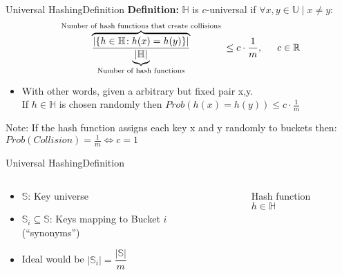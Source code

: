 
\begin{frame}{Universal Hashing}{Definition}
  \textbf{Definition:}
  $\mathbb{H}$ is {\color{Mittel-Blau}$c$-universal} if
  $\forall x, y \in \mathbb{U} \mid x \neq y:$
  \begin{displaymath}
    \overbrace{
      \frac{
        \vert \{h \in \mathbb{H}\!: h(x) = h(y)\} \vert
      }{
      \underbrace{\vert \mathbb{H} \vert}_\text{Number of hash functions}
      }
    }^\text{
      Number of hash functions that create collisions
    }
    \leq c \cdot \frac{1}{m}, \hspace*{1.5em} c \in \mathbb{R}
  \end{displaymath}
  \vspace{-1em}
  \begin{itemize}
  \item <2->
      With other words, given a arbitrary but fixed pair x,y.\\
      If $h \in \mathbb{H}$ is chosen randomly then
      $Prob ( h(x) = h(y) ) \leq c \cdot \frac{1}{m}$
  \end{itemize}
  \begin{block}{Note: If the hash function assigns each key x and y
    randomly to buckets then:}
    $Prob( Collision ) = \frac{1}{m} \Leftrightarrow c = 1$
  \end{block}
\end{frame}


\begin{frame}{Universal Hashing}{Definition}
  \begin{columns}
    \begin{column}{0.5\linewidth}
      \begin{itemize}
        \item
          $\mathbb{S}$:
          Key universe
        \item
          $\mathbb{S}_i \subseteq \mathbb{S}$:
          Keys mapping to Bucket $i$ (\enquote{synonyms})
       \item
         Ideal would be
         $\vert \mathbb{S}_i \vert =\dfrac{\vert \mathbb{S} \vert}{m}$
      \end{itemize}
    \end{column}
    \begin{column}{0.5\linewidth}
      \begin{figure}[!h]%
        \begin{adjustbox}{width=\linewidth}%
        \end{adjustbox}
        \caption{Hash function $h \in \mathbb{H}$}%
        \label{fig:universal_hashing:hash_function_to_bucket}
      \end{figure}
    \end{column}
  \end{columns}
\end{frame}

